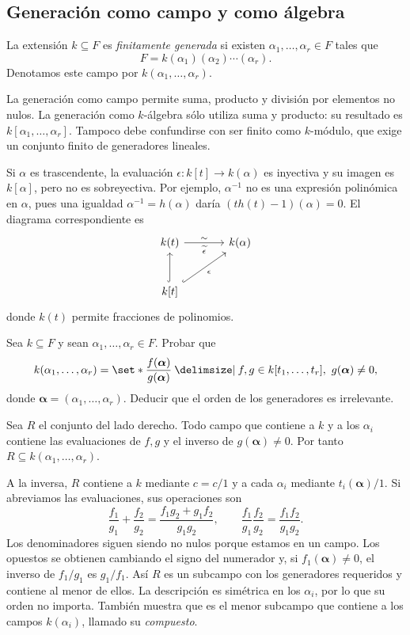 \subsection{Generación como campo y como álgebra}\label{tema:23-2-1}
\begin{defi}
La extensión $k\subseteq F$ es \emph{finitamente generada} si existen $\alpha_1,\ldots,\alpha_r\in F$ tales que
\[
F=k(\alpha_1)(\alpha_2)\cdots(\alpha_r).
\]
Denotamos este campo por $k(\alpha_1,\ldots,\alpha_r)$.
\end{defi}
La generación como campo permite suma, producto y división por elementos no nulos. La generación como $k$-álgebra sólo utiliza suma y producto: su resultado es $k[\alpha_1,\ldots,\alpha_r]$. Tampoco debe confundirse con ser finito como $k$-módulo, que exige un conjunto finito de generadores lineales.

Si $\alpha$ es trascendente, la evaluación $\epsilon:k[t]\to k(\alpha)$ es inyectiva y su imagen es $k[\alpha]$, pero no es sobreyectiva. Por ejemplo, $\alpha^{-1}$ no es una expresión polinómica en $\alpha$, pues una igualdad $\alpha^{-1}=h(\alpha)$ daría $(th(t)-1)(\alpha)=0$. El diagrama correspondiente es
\[
\begin{tikzcd}[column sep=large,row sep=large]
k(t)\arrow[r,"\sim","\widetilde\epsilon"']&k(\alpha)\\
k[t]\arrow[u,hook]\arrow[ur,hook,"\epsilon"']&
\end{tikzcd}
\]
donde $k(t)$ permite fracciones de polinomios.


\begin{ejer}\label{ejer:C23-generadores}
Sea $k\subseteq F$ y sean $\alpha_1,\ldots,\alpha_r\in F$. Probar que
\[
k(\alpha_1,\ldots,\alpha_r)
=\set*{\frac{f(\boldsymbol\alpha)}{g(\boldsymbol\alpha)}\given
f,g\in k[t_1,\ldots,t_r],\ g(\boldsymbol\alpha)\ne0},
\]
donde $\boldsymbol\alpha=(\alpha_1,\ldots,\alpha_r)$. Deducir que el orden de los generadores es irrelevante.
\end{ejer}

\begin{sol}
Sea $R$ el conjunto del lado derecho. Todo campo que contiene a $k$ y a los $\alpha_i$ contiene las evaluaciones de $f,g$ y el inverso de $g(\boldsymbol\alpha)\ne0$. Por tanto $R\subseteq k(\alpha_1,\ldots,\alpha_r)$.

A la inversa, $R$ contiene a $k$ mediante $c=c/1$ y a cada $\alpha_i$ mediante $t_i(\boldsymbol\alpha)/1$. Si abreviamos las evaluaciones, sus operaciones son
\[
\frac{f_1}{g_1}+\frac{f_2}{g_2}
=\frac{f_1g_2+g_1f_2}{g_1g_2},
\qquad
\frac{f_1}{g_1}\frac{f_2}{g_2}=\frac{f_1f_2}{g_1g_2}.
\]
Los denominadores siguen siendo no nulos porque estamos en un campo. Los opuestos se obtienen cambiando el signo del numerador y, si $f_1(\boldsymbol\alpha)\ne0$, el inverso de $f_1/g_1$ es $g_1/f_1$. Así $R$ es un subcampo con los generadores requeridos y contiene al menor de ellos. La descripción es simétrica en los $\alpha_i$, por lo que su orden no importa. También muestra que es el menor subcampo que contiene a los campos $k(\alpha_i)$, llamado su \emph{compuesto}.
\end{sol}

